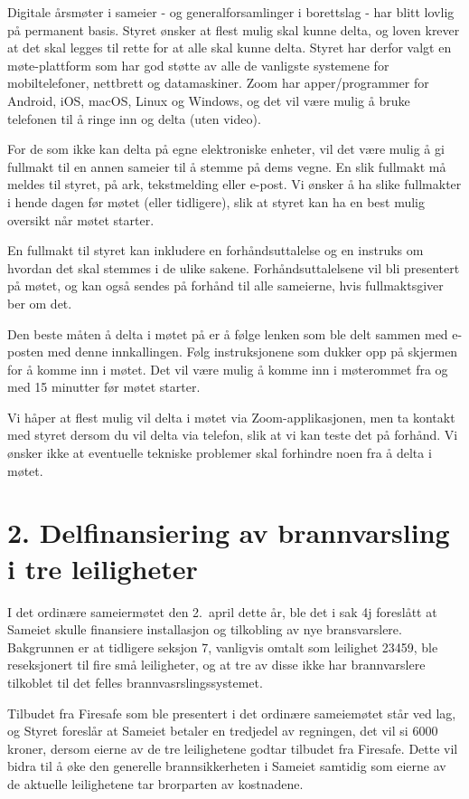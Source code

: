 \documentclass[12pt]{article}
\begin{document}
\raggedright
\sloppy

Digitale årsmøter i sameier - og generalforsamlinger i borettslag - har blitt lovlig på permanent
basis. Styret ønsker at flest mulig skal kunne delta, og loven krever at det skal legges til rette
for at alle skal kunne delta. Styret har derfor valgt en møte-plattform som har god støtte av alle
de vanligste systemene for mobiltelefoner, nettbrett og datamaskiner. Zoom har apper/programmer for
Android, iOS, macOS, Linux og Windows, og det vil være mulig å bruke telefonen til å ringe inn og
delta (uten video).

For de som ikke kan delta på egne elektroniske enheter, vil det være mulig å gi fullmakt til en
annen sameier til å stemme på dems vegne. En slik fullmakt må meldes til styret, på ark,
tekstmelding eller e-post. Vi ønsker å ha slike fullmakter i hende dagen før møtet (eller
tidligere), slik at styret kan ha en best mulig oversikt når møtet starter.

En fullmakt til styret kan inkludere en forhåndsuttalelse og en instruks om hvordan det skal
stemmes i de ulike sakene. Forhåndsuttalelsene vil bli presentert på møtet, og kan også sendes på
forhånd til alle sameierne, hvis fullmaktsgiver ber om det.

Den beste måten å delta i møtet på er å følge lenken som ble delt sammen med e-posten med denne
innkallingen. Følg instruksjonene som dukker opp på skjermen for å komme inn i møtet.  Det vil være
mulig å komme inn i møterommet fra og med 15 minutter før møtet starter.

Vi håper at flest mulig vil delta i møtet via Zoom-applikasjonen, men ta kontakt med styret dersom
du vil delta via telefon, slik at vi kan teste det på forhånd. Vi ønsker ikke at eventuelle tekniske
problemer skal forhindre noen fra å delta i møtet.

\section*{2. Delfinansiering av brannvarsling i tre leiligheter}

I det ordinære sameiermøtet den 2.\ april dette år, ble det i sak 4j foreslått at Sameiet skulle
finansiere installasjon og tilkobling av nye bransvarslere. Bakgrunnen er at tidligere seksjon 7,
vanligvis omtalt som leilighet 23459, ble reseksjonert til fire små leiligheter, og at tre av disse
ikke har brannvarslere tilkoblet til det felles brannvasrslingssystemet.

Tilbudet fra Firesafe som ble presentert i det ordinære sameiemøtet står ved lag, og Styret
foreslår at Sameiet betaler en tredjedel av regningen, det vil si 6000 kroner, dersom eierne av de
tre leilighetene godtar tilbudet fra Firesafe. Dette vil bidra til å øke den generelle
brannsikkerheten i Sameiet samtidig som eierne av de aktuelle leilighetene tar brorparten av
kostnadene.
\end{document}
